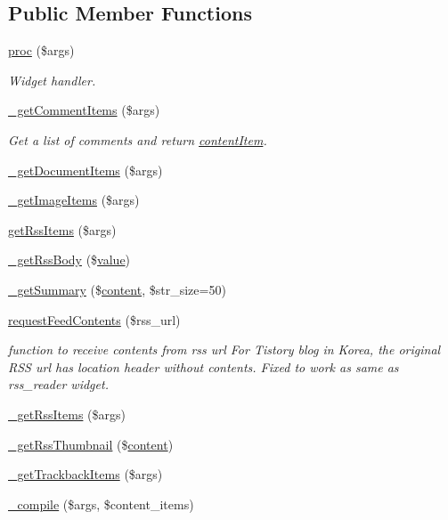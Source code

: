 \subsection*{Public Member Functions}
\begin{DoxyCompactItemize}
\item 
\hyperlink{classcontent_aacac5eb20ef4b64552d77bd5d2e2bf99}{proc} (\$args)
\begin{DoxyCompactList}\small\item\em Widget handler. \end{DoxyCompactList}\item 
\hyperlink{classcontent_a257f112a3719c28356bd49c336d3ad2f}{\+\_\+get\+Comment\+Items} (\$args)
\begin{DoxyCompactList}\small\item\em Get a list of comments and return \hyperlink{classcontentItem}{content\+Item}. \end{DoxyCompactList}\item 
\hyperlink{classcontent_ac3e0ed7e0c14712bd93e68cae1603e2f}{\+\_\+get\+Document\+Items} (\$args)
\item 
\hyperlink{classcontent_abdff6ddbe036e410913b5da1b9a5ce1b}{\+\_\+get\+Image\+Items} (\$args)
\item 
\hyperlink{classcontent_a78e600f4e35fe539b4ae34218d702e04}{get\+Rss\+Items} (\$args)
\item 
\hyperlink{classcontent_a75dcd12f149001ea88ceb13a286ce040}{\+\_\+get\+Rss\+Body} (\$\hyperlink{jquery_8js_abe5393d870043cf6aaa1d5ad5fce755c}{value})
\item 
\hyperlink{classcontent_ae3e4dc54c21e3ac9eb67d547d914661a}{\+\_\+get\+Summary} (\$\hyperlink{classcontent}{content}, \$str\+\_\+size=50)
\item 
\hyperlink{classcontent_a6f9991d17df1b915196ca159512552a1}{request\+Feed\+Contents} (\$rss\+\_\+url)
\begin{DoxyCompactList}\small\item\em function to receive contents from rss url For Tistory blog in Korea, the original R\+SS url has location header without contents. Fixed to work as same as rss\+\_\+reader widget. \end{DoxyCompactList}\item 
\hyperlink{classcontent_aa541a575f915fc5fddbd5075a545d991}{\+\_\+get\+Rss\+Items} (\$args)
\item 
\hyperlink{classcontent_afe1cfad315cf8f3aeb352b22d0020142}{\+\_\+get\+Rss\+Thumbnail} (\$\hyperlink{classcontent}{content})
\item 
\hyperlink{classcontent_a4cdf2e0d2ede8a8bca1c61526f920adc}{\+\_\+get\+Trackback\+Items} (\$args)
\item 
\hyperlink{classcontent_a297e1dd4d257abab532a9a9d99847ee8}{\+\_\+compile} (\$args, \$content\+\_\+items)
\end{DoxyCompactItemize}
